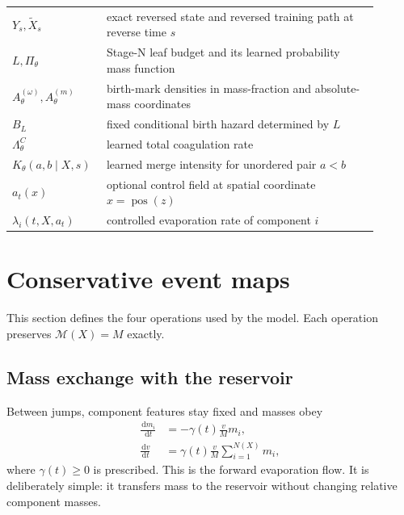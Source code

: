 \documentclass[10pt]{article}
\theoremstyle{definition}
\theoremstyle{remark}
\newcommand{\dd}{\,\mathrm{d}}
\begin{document}
\begin{center}
\begin{tabular}{>{\raggedright\arraybackslash}p{0.20\linewidth}p{0.70\linewidth}}
$Y_s,\widetilde X_s$ & exact reversed state and reversed training path at reverse time $s$ \\
$L,\Pi_\theta$ & Stage-N leaf budget and its learned probability mass function \\
$A_\theta^{(\omega)},A_\theta^{(m)}$ & birth-mark densities in mass-fraction and absolute-mass coordinates \\
$B_L$ & fixed conditional birth hazard determined by $L$ \\
$\Lambda_\theta^C$ & learned total coagulation rate \\
$K_\theta(a,b\mid X,s)$ & learned merge intensity for unordered pair $a<b$ \\
$a_t(x)$ & optional control field at spatial coordinate $x=\operatorname{pos}(z)$ \\
$\lambda_i(t,X,a_t)$ & controlled evaporation rate of component $i$ \\
\bottomrule
\end{tabular}
\end{center}

\section{Conservative event maps}
\label{sec:event-maps}

This section defines the four operations used by the model.  Each operation preserves $\mathcal M(X)=M$ exactly.

\subsection{Mass exchange with the reservoir}

Between jumps, component features stay fixed and masses obey
\begin{align}
  \frac{\dd m_i}{\dd t}
  &=-\gamma(t)\frac{v}{M}m_i,
  \label{eq:forward-flow-mi}\\
  \frac{\dd v}{\dd t}
  &=\gamma(t)\frac{v}{M}\sum_{i=1}^{N(X)}m_i,
  \label{eq:forward-flow-v}
\end{align}
where $\gamma(t)\geq0$ is prescribed.  This is the forward evaporation flow.  It is deliberately simple: it transfers mass to the reservoir without changing relative component masses.
\end{document}
